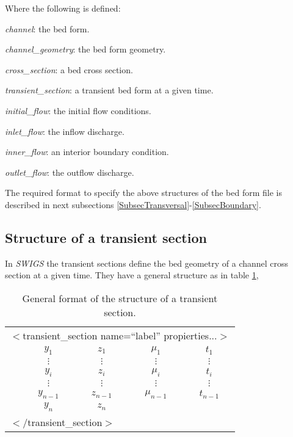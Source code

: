 \documentclass[a4paper,12pt]{article}
\newcommand{\TABLE}[4]
{
	\begin{table}[ht!]\centering
	\begin{tabular}{#1}\hline#2\\\hline\end{tabular}
	\caption{#3.\label{#4}}\end{table}
}
\newcommand{\swigs}{\emph{SWIGS}}
\begin{document}
Where the following is defined:
\begin{description}
\item\emph{channel}: the bed form.
\item\emph{channel\_geometry}: the bed form geometry.
\item\emph{cross\_section}: a bed cross section.
\item\emph{transient\_section}: a transient bed form at a given time.
\item\emph{initial\_flow}: the initial flow conditions.
\item\emph{inlet\_flow}: the inflow discharge.
\item\emph{inner\_flow}: an interior boundary condition.
\item\emph{outlet\_flow}: the outflow discharge.
\end{description}

The required format to specify the above structures of the bed form file is
described in next subsections \ref{SubsecTransversal}-\ref{SubsecBoundary}.

\subsection{Structure of a transient section\label{SubsecTransversal}}

In {\swigs} the transient sections define the bed geometry of a channel cross
section at a given time. They have a general structure as in table
\ref{TabTransversal},
\TABLE{ccccc}
{
	\multicolumn{5}{l}{$<$transient\_section name=``label'' propierties...$>$}\\
	&$y_1$&$z_1$&$\mu_1$&$t_1$\\&$\vdots$&$\vdots$&$\vdots$&$\vdots$\\
	&$y_i$&$z_i$&$\mu_i$&$t_i$\\&$\vdots$&$\vdots$&$\vdots$&$\vdots$\\
	&$y_{n-1}$&$z_{n-1}$&$\mu_{n-1}$&$t_{n-1}$\\&$y_n$&$z_n$\\
	\multicolumn{5}{l}{$<$/transient\_section$>$}
}{General format of the structure of a transient section}{TabTransversal}
\end{document}
